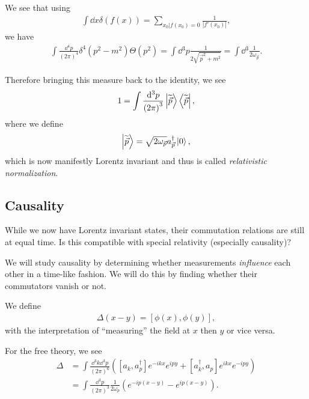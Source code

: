 We see that using 
\begin{align}
    \int \dd{x} \delta \left( f \left( x \right)  \right) = \sum_{x_0 | f\left( x_0 \right) = 0}^{} \frac{1}{\left| f'\left( x_0 \right)  \right| }
,\end{align}
we have
\begin{align}
\int \frac{\dd{^{4}p}}{\left( 2\pi \right)^{4}} \delta^{4} \left( p^2 - m^2 \right)  \Theta \left( p^2 \right) = \int \dd{^3p} \frac{1}{2 \sqrt{\vec{p}^2 + m^2}} = \int \dd{^3} \frac{1}{2 \omega_{\vec{p}}}
.\end{align}

Therefore bringing this measure back to the identity, we see
\begin{align}
    1 = \int \frac{\dd{^3p}}{\left( 2\pi \right)^3} \ket{\widetilde{\vec{p}}} \bra{\widetilde{\vec{p}}}
,\end{align}
where we define
\begin{align}
    \ket{\widetilde{\vec{p}}} = \sqrt{2 \omega_{\vec{p}}} a^{\dag}_{\vec{p}} \ket{0} 
,\end{align}
which is now manifestly Lorentz invariant and thus is called \textit{relativistic normalization}.

\subsection{Causality}

While we now have Lorentz invariant states, their commutation relations are still at equal time. Is this compatible with special relativity (especially causality)?

We will study causality by determining whether measurements \textit{influence} each other in a time-like fashion. We will do this by finding whether their commutators vanish or not.

We define
\begin{align}
    \Delta \left( x - y \right) = \left[ \phi \left( x \right) , \phi \left( y \right)  \right] 
,\end{align}
with the interpretation of ``measuring'' the field at $x$ then $y$ or vice versa.

For the free theory, we see
\begin{align}
    \Delta &= \int \frac{\dd{^3k} \dd{^3p}}{\left( 2\pi \right)^{6}} \left( \left[ a_k, a_p^{\dag} \right] e^{-ikx} e^{i py} + \left[ a_k^{\dag}, a_p  \right] e^{ikx} e^{-ipy}   \right) \\
    &= \int \frac{\dd{^3p}}{\left( 2\pi \right)^3} \frac{1}{2 \omega_p} \left( e^{-i p \left( x - y \right) } - e^{i p \left( x -y \right) } \right)
.\end{align}

